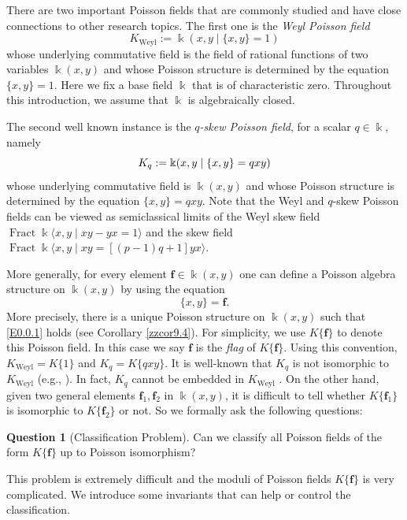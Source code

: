 \documentclass[12pt]{amsart}
\theoremstyle{plain}
\numberwithin{theorem}{section}
\numberwithin{equation}{theorem}
\theoremstyle{definition}
\newtheorem{question}[theorem]{Question}
\DeclareMathOperator \Fract { {\mathrm{Fract}} }
\newcommand \bff {{\mathbf{f}}}
\DeclareMathOperator{\Weyl}{Weyl}
\newcommand \Kweyl {K_{\Weyl}}
\begin{document}
There are two important Poisson fields 
that are commonly studied and have close 
connections to other research topics. The 
first one is the {\it Weyl Poisson field} 
$$\Kweyl:=\Bbbk(x,y\mid \{x,y\}=1)$$ 
whose underlying commutative field is 
the field of rational functions of two 
variables $\Bbbk(x,y)$ and whose Poisson 
structure is determined by the equation 
$\{x,y\}=1$. Here we fix a base field 
$\Bbbk$ that is of characteristic zero. 
Throughout this introduction, we assume 
that $\Bbbk$ is algebraically closed.

The second well known instance is the 
{\it $q$-skew Poisson field}, for a scalar 
$q \in \Bbbk$, namely 
\begin{equation} 
\notag
K_{q}:=\Bbbk(x,y\mid \{x,y\}=qxy)
\end{equation}
whose underlying commutative field is 
$\Bbbk(x,y)$ and whose Poisson structure 
is determined by the equation $\{x,y\}=qxy$. 
Note that the Weyl and $q$-skew Poisson 
fields can be viewed as semiclassical 
limits of the Weyl skew field 
$\Fract \Bbbk \langle x,y\mid xy-yx=1 
\rangle$ and the skew field 
$\Fract \Bbbk \langle x,y\mid xy 
= [(p-1)q+1] yx \rangle$. 

More generally, for every element 
$\bff\in \Bbbk(x,y)$ one can define a 
Poisson algebra structure on $\Bbbk(x,y)$ 
by using the equation
\begin{equation}
\label{E0.0.1}\tag{E0.0.1}
\{x,y\}=\bff. 
\end{equation}
More precisely, there is a unique Poisson 
structure on $\Bbbk(x,y)$ such that 
\eqref{E0.0.1} holds (see Corollary 
\ref{zzcor9.4}). For simplicity, 
we use $K\{\bff\}$ to denote this 
Poisson field. In this case we say $\bff$ 
is the {\it flag} of $K\{\bff\}$. Using 
this convention, $\Kweyl=K\{1\}$ and 
$K_{q}=K\{qxy\}$. It is well-known that 
$K_{q}$ is not isomorphic to $\Kweyl$ 
(e.g., \cite[Corollary 5.3]{GoLa}). In 
fact, $K_{q}$ cannot be embedded in 
$\Kweyl$ \cite[Corollary 5.9(2)]{HTWZ2}. 
On the other hand, given two general 
elements $\bff_1, \bff_2$ in $\Bbbk(x,y)$, 
it is difficult to tell whether 
$K\{\bff_1\}$ is isomorphic to $K\{\bff_2\}$ 
or not. So we formally ask the following 
questions:

\begin{question}[Classification Problem]
\label{zzque0.1}
Can we classify all Poisson fields of 
the form $K\{\bff\}$ up to Poisson 
isomorphism? 
\end{question}

This problem is extremely difficult and 
the moduli of Poisson fields $K\{\bff\}$ 
is very complicated. We introduce some 
invariants that can help or control the 
classification. 
\end{document}
